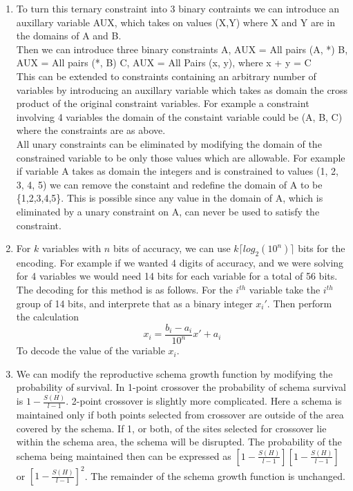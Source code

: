 \documentclass[11pt,fleqn]{article}
\begin{document}
\begin{enumerate}
\item %
To turn this ternary constraint into 3 binary contraints we can introduce an auxillary variable AUX, which takes on values (X,Y) where X and Y are in the domains of A and B. \\
Then we can introduce three binary constraints
A, AUX = All pairs (A, *) 
B, AUX = All pairs (*, B) 
C, AUX = All Pairs (x, y), where x + y = C
\\
This can be extended to constraints containing an arbitrary number of variables by introducing an auxillary variable which takes as domain the cross product of the original constraint variables. For example a constraint involving 4 variables the domain of the constaint variable could be (A, B, C) where the constraints are as above. 
\\
All unary constraints can be eliminated by modifying the domain of the constrained variable to be only those values which are allowable. For example if variable A takes as domain the integers and is constrained to values (1, 2, 3, 4, 5) we can remove the constaint and redefine the domain of A to be \{1,2,3,4,5\}. This is possible since any value in the domain of A, which is eliminated by a unary constraint on A, can never be used to satisfy the constraint.  

\item %
For $k$ variables with $n$ bits of accuracy, we can use $k \lceil log_{2}(10^{n}) \rceil$ bits for the encoding. For example if we wanted 4 digits of accuracy, and we were solving for 4 variables we would need 14 bits for each variable for a total of 56 bits. \\

The decoding for this method is as follows. For the $i^{th}$ variable take the $i^{th}$ group of 14 bits, and interprete that as a binary integer $x_{i}'$. Then perform the calculation 
\[
 x_{i} = \frac{b_{i}-a_{i}}{10^{n}}x' + a_{i}
\]
To decode the value of the variable $x_{i}$.

\item %
We can modify the reproductive schema growth function by modifying the probability of survival. In 1-point crossover the probability of schema survival is $1-\frac{S(H)}{l-1}$. 2-point crossover is slightly more complicated. Here a schema is maintained only if both points selected from crossover are outside of the area covered by the schema. If 1, or both, of the sites selected for crossover lie within the schema area, the schema will be disrupted. The probability of the schema being maintained then can be expressed as $[1-\frac{S(H)}{l-1}][1-\frac{S(H)}{l-1}]$ or $[1-\frac{S(H)}{l-1}]^{2}$. The remainder of the schema growth function is unchanged. 

\end{enumerate}
\end{document}
